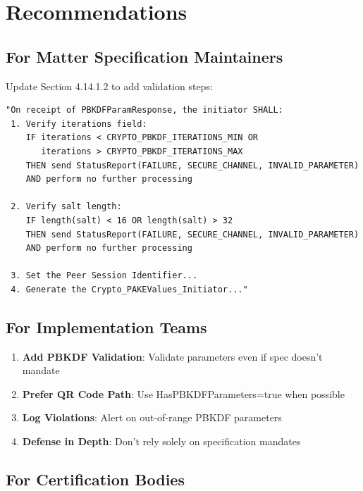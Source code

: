 \documentclass[11pt,a4paper]{article}
\begin{document}
\section{Recommendations}

\subsection{For Matter Specification Maintainers}

\begin{gapbox}
Update Section 4.14.1.2 to add validation steps:

\begin{lstlisting}[style=protocolstyle]
"On receipt of PBKDFParamResponse, the initiator SHALL:
 1. Verify iterations field:
    IF iterations < CRYPTO_PBKDF_ITERATIONS_MIN OR
       iterations > CRYPTO_PBKDF_ITERATIONS_MAX
    THEN send StatusReport(FAILURE, SECURE_CHANNEL, INVALID_PARAMETER)
    AND perform no further processing
    
 2. Verify salt length:
    IF length(salt) < 16 OR length(salt) > 32
    THEN send StatusReport(FAILURE, SECURE_CHANNEL, INVALID_PARAMETER)
    AND perform no further processing
    
 3. Set the Peer Session Identifier...
 4. Generate the Crypto_PAKEValues_Initiator..."
\end{lstlisting}
\end{gapbox}

\subsection{For Implementation Teams}

\begin{enumerate}
    \item \textbf{Add PBKDF Validation}: Validate parameters even if spec doesn't mandate
    \item \textbf{Prefer QR Code Path}: Use HasPBKDFParameters=true when possible
    \item \textbf{Log Violations}: Alert on out-of-range PBKDF parameters
    \item \textbf{Defense in Depth}: Don't rely solely on specification mandates
\end{enumerate}

\subsection{For Certification Bodies}
\end{document}
